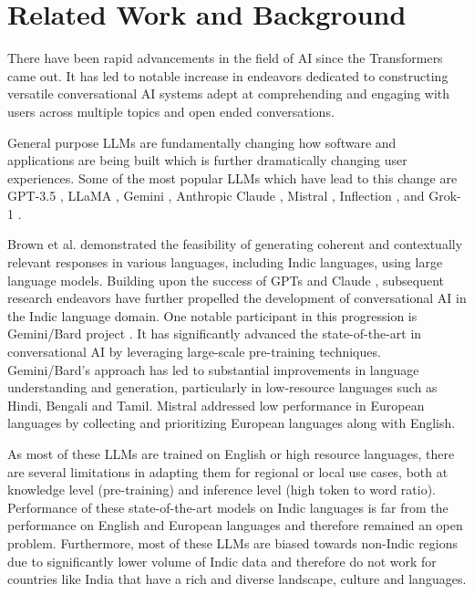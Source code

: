 \section{Related Work and Background}
There have been rapid advancements in the field of AI since the Transformers \cite{vaswani2023attention} came out. It has led to notable increase in endeavors dedicated to constructing versatile conversational AI systems adept at comprehending and engaging with users across multiple topics and open ended conversations. 

General purpose LLMs are fundamentally changing how software and applications are being built which is further dramatically changing user experiences. Some of the most popular LLMs which have lead to this change are GPT-3.5 \cite{achiam2023gpt, brown2020language}, LLaMA \cite{touvron2023llama}, Gemini \cite{geminiteam2023gemini}, Anthropic Claude \cite{claude}, Mistral \cite{jiang2023mistral}, Inflection \cite{inflection}, and Grok-1 \cite{grok}. 

Brown et al.\cite{brown2020language} demonstrated the feasibility of generating coherent and contextually relevant responses in various languages, including Indic languages, using large language models.
Building upon the success of GPTs and Claude \cite{claude, Askell2021AGL, kadavath2022language}, subsequent research endeavors have further propelled the development of conversational AI in the Indic language domain. One notable participant in this progression is Gemini/Bard project \cite{geminiteam2023gemini}. It has significantly advanced the state-of-the-art in conversational AI by leveraging large-scale pre-training techniques. Gemini/Bard's approach has led to substantial improvements in language understanding and generation, particularly in low-resource languages such as Hindi, Bengali and Tamil. Mistral \cite{jiang2023mistral} addressed low performance in European languages by collecting and prioritizing European languages along with English.

As most of these LLMs are trained on English or high resource languages, there are several limitations in adapting them for regional or local use cases, both at knowledge level (pre-training) and inference level (high token to word ratio).  Performance of these state-of-the-art models on Indic languages is far from the performance on English and European languages and therefore remained an open problem. Furthermore, most of these LLMs are biased towards non-Indic regions due to significantly lower volume of Indic data and therefore do not work for countries like India that have a rich and diverse landscape, culture and languages. 

